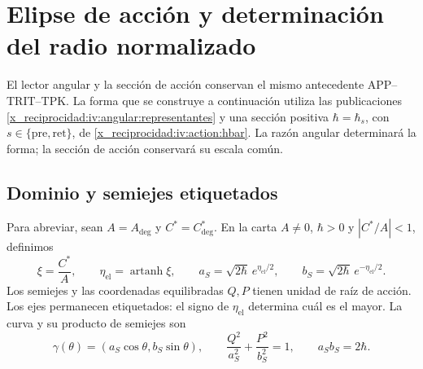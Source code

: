 \section{Elipse de acción y determinación del radio normalizado}
\label{x_reciprocidad:iv:ellipse:section}

El lector angular y la sección de acción conservan el mismo
antecedente APP--TRIT--TPK. La forma que se construye a
continuación utiliza las publicaciones
\eqref{x_reciprocidad:iv:angular:representantes} y una sección positiva
\(\hbar=\hbar_s\), con
\(s\in\{\mathrm{pre},\mathrm{ret}\}\), de
\eqref{x_reciprocidad:iv:action:hbar}. La razón angular determinará la forma;
la sección de acción conservará su escala común.

\subsection{Dominio y semiejes etiquetados}
\label{x_reciprocidad:iv:ellipse:dominio}

Para abreviar, sean \(A=A_{\deg}\) y \(C^*=C^*_{\deg}\).
En la carta \(A\ne0\), \(\hbar>0\) y \(|C^*/A|<1\),
definimos
\begin{equation}
 \xi=\frac{C^*}{A},\qquad
 \eta_{\mathrm{el}}=\operatorname{artanh}\xi,\qquad
 a_S=\sqrt{2\hbar}\,e^{\eta_{\mathrm{el}}/2},\qquad
 b_S=\sqrt{2\hbar}\,e^{-\eta_{\mathrm{el}}/2}.
 \label{x_reciprocidad:iv:ellipse:semiejes}
\end{equation}
Los semiejes y las coordenadas equilibradas \(Q,P\) tienen
unidad de raíz de acción. Los ejes permanecen etiquetados:
el signo de \(\eta_{\mathrm{el}}\) determina cuál es el
mayor. La curva y su producto de semiejes son
\begin{equation}
 \gamma(\theta)=(a_S\cos\theta,b_S\sin\theta),\qquad
 \frac{Q^2}{a_S^2}+\frac{P^2}{b_S^2}=1,\qquad
 a_Sb_S=2\hbar.
 \label{x_reciprocidad:iv:ellipse:curva}
\end{equation}


